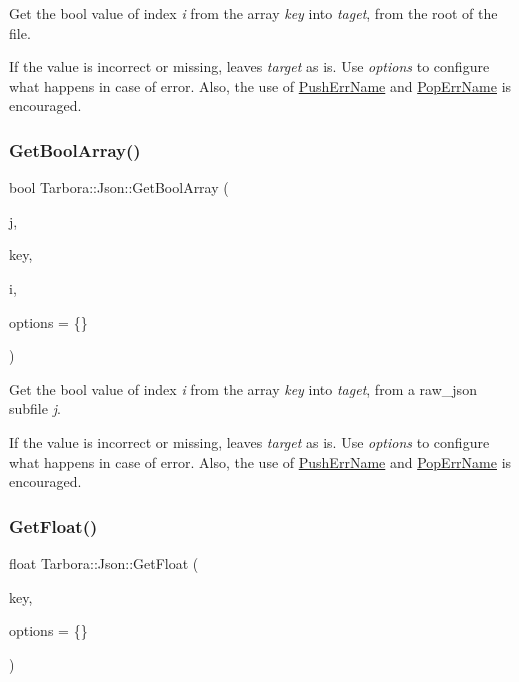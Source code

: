 Get the bool value of index {\itshape i} from the array {\itshape key} into {\itshape taget}, from the root of the file. 

If the value is incorrect or missing, leaves {\itshape target} as is. Use {\itshape options} to configure what happens in case of error. Also, the use of \hyperlink{classTarbora_1_1Json_a061eac4f16dac3b9b3a26a66de0ea8f0}{Push\+Err\+Name} and \hyperlink{classTarbora_1_1Json_a14019f06d3bd76edd6a6e78134519d11}{Pop\+Err\+Name} is encouraged. \mbox{\label{classTarbora_1_1Json_a79c56d65e975c8f0209a022e81a3ea77}} 
\subsubsection{\texorpdfstring{Get\+Bool\+Array()}{GetBoolArray()}\hspace{0.1cm}{\footnotesize\ttfamily [2/2]}}
{\footnotesize\ttfamily bool Tarbora\+::\+Json\+::\+Get\+Bool\+Array (\begin{DoxyParamCaption}\item[{raw\+\_\+json}]{j,  }\item[{const char $\ast$}]{key,  }\item[{int}]{i,  }\item[{\hyperlink{structTarbora_1_1JsonOptions}{Json\+Options}}]{options = {\ttfamily \{\}} }\end{DoxyParamCaption})}



Get the bool value of index {\itshape i} from the array {\itshape key} into {\itshape taget}, from a raw\+\_\+json subfile {\itshape j}. 

If the value is incorrect or missing, leaves {\itshape target} as is. Use {\itshape options} to configure what happens in case of error. Also, the use of \hyperlink{classTarbora_1_1Json_a061eac4f16dac3b9b3a26a66de0ea8f0}{Push\+Err\+Name} and \hyperlink{classTarbora_1_1Json_a14019f06d3bd76edd6a6e78134519d11}{Pop\+Err\+Name} is encouraged. \mbox{\label{classTarbora_1_1Json_ac537db65e750364c0de9749bd19caf06}} 
\subsubsection{\texorpdfstring{Get\+Float()}{GetFloat()}\hspace{0.1cm}{\footnotesize\ttfamily [1/3]}}
{\footnotesize\ttfamily float Tarbora\+::\+Json\+::\+Get\+Float (\begin{DoxyParamCaption}\item[{const char $\ast$}]{key,  }\item[{\hyperlink{structTarbora_1_1JsonOptions}{Json\+Options}}]{options = {\ttfamily \{\}} }\end{DoxyParamCaption})}



